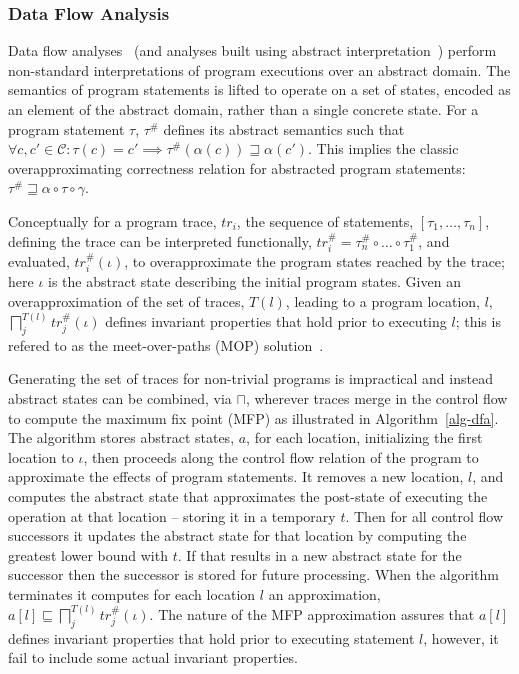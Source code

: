 \subsubsection{Data Flow Analysis}
Data flow analyses~\cite{kildall1973unified} 
(and analyses built using abstract interpretation~\cite{cousot1977abstract}) perform
non-standard interpretations of program executions over an abstract domain.  
The semantics of program statements is lifted to operate
on a set of states, encoded as an element of the abstract domain,
rather than a single concrete state.  
For a program statement $\tau$,
$\tau^\#$ defines its abstract semantics such that
$\forall c, c' \in \mathcal{C} : \tau(c) = c' \implies \tau^\#(\alpha(c)) \sqsupseteq \alpha(c')$.  This implies the classic overapproximating correctness
relation for abstracted program statements:
$\tau^\# \sqsupseteq \alpha \circ \tau \circ \gamma$.

Conceptually for a program trace, $tr_i$, the sequence of 
statements, $[\tau_1,\ldots,\tau_n]$, defining the trace can
be interpreted functionally, $tr_i^\# = \tau_{n}^\# \circ \ldots \circ \tau_1^\#$,
and evaluated, $tr_i^\#(\iota)$,
to overapproximate the program states reached by the trace; 
here $\iota$ is the abstract state describing the initial program states.
Given an overapproximation of the set of traces, $T(l)$, leading to a 
program location, $l$, 
$\displaystyle\bigsqcap_j^{T(l)} tr_j^\#(\iota)$ 
defines invariant properties that hold prior to executing $l$; this
is refered to as the meet-over-paths (MOP) solution~\cite{kildall1973unified}.

Generating the set of traces for non-trivial programs is impractical 
and instead abstract states can be combined, via $\sqcap$, wherever
traces merge in the control flow to compute the maximum fix point (MFP)
as illustrated in Algorithm~\ref{alg-dfa}.
The algorithm stores abstract states, $a$, for each location, initializing
the first location to $\iota$, then proceeds along the control
flow relation of the program to approximate the effects of program
statements.  It removes a new location, $l$, and computes the abstract
state that approximates the post-state of executing the operation
at that location -- storing it in a temporary $t$.  Then for
all control flow successors it updates the abstract state for
that location by computing the greatest lower bound with $t$.
If that results in a new abstract state for the successor then
the successor is stored for future processing.  When the algorithm
terminates it computes for each location $l$ an approximation,
$a[l] \sqsubseteq \displaystyle\bigsqcap_j^{T(l)} tr_j^\#(\iota)$.
The nature of the MFP approximation assures that $a[l]$ defines
invariant properties that hold prior to executing statement $l$, however,
it fail to include some actual invariant properties.

